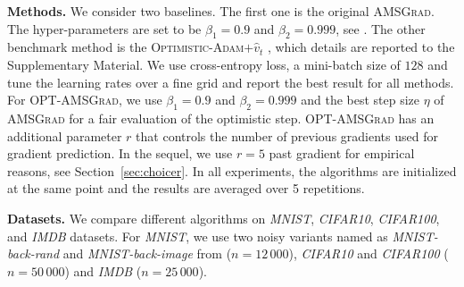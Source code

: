 \documentclass[11pt]{article}
\theoremstyle{k}
\begin{document}
\textbf{Methods.}
We consider two baselines. The first one is the original \textsc{AMSGrad}. 
The hyper-parameters are set to be $\beta_1 = 0.9$ and $\beta_2 = 0.999$, see \citep{RKK18}. 
The other benchmark method is the \textsc{Optimistic-Adam$+\hat{v}_t$} \citep{DISZ18}, which details are reported to the Supplementary Material. 
We use cross-entropy loss, a mini-batch size of $128$ and tune the learning rates over a fine grid and report the best result for all methods.
For \textsc{OPT-AMSGrad}, we use $\beta_1 = 0.9$ and $\beta_2 = 0.999$ and the best step size $\eta$ of \textsc{AMSGrad} for a fair evaluation of the optimistic step. 
\textsc{OPT-AMSGrad} has an additional parameter $r$ that controls the number of previous gradients used for gradient prediction. 
In the sequel, we use $r=5$ past gradient for empirical reasons, see Section~\ref{sec:choicer}.
In all experiments, the algorithms are initialized at the same point and the results are averaged over 5 repetitions.

\textbf{Datasets.}
We compare different algorithms on \textit{MNIST}, \textit{CIFAR10},
\textit{CIFAR100}, and \textit{IMDB} datasets. 
For \textit{MNIST}, we use two noisy variants named as \textit{MNIST-back-rand} and \textit{MNIST-back-image} from \citep{MNIST07} ($n=12\,000$), \textit{CIFAR10} and \textit{CIFAR100} ($n=50\,000$) and \textit{IMDB} ($n=25\,000$). 
\end{document}
